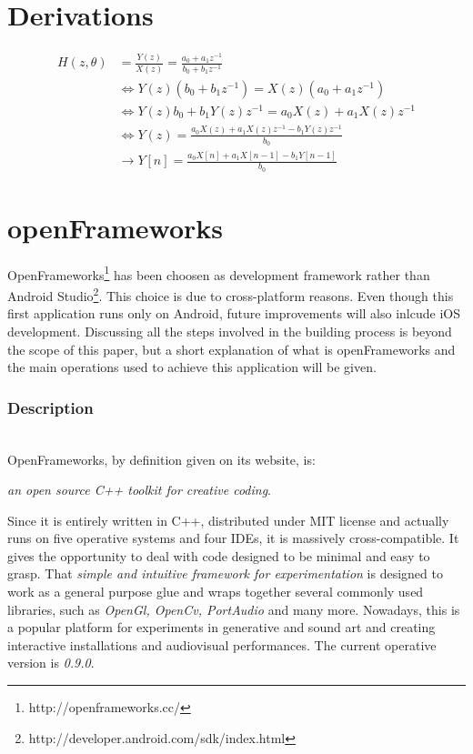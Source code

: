\documentclass[journal]{IEEEtran}
\begin{document}
\begin{appendices}
\section{Derivations}
\begin{equation*}\label{eq:DerivationC++}
\begin{split}
H(z, \theta) &= \frac{Y(z)}{X(z)} = \frac{a_0+a_1z^{-1}}{b_0+b_1z^{-1}}\\
&\iff Y(z)(b_0+b_1z^{-1}) = X(z)(a_0+a_1z^{-1})\\
&\iff Y(z)b_0+b_1Y(z)z^{-1} = a_0X(z)+a_1X(z)z^{-1}\\
&\iff Y(z) = \frac{a_0X(z)+a_1X(z)z^{-1}-b_1Y(z)z^{-1}}{b_0}\\
&\rightarrow Y[n] = \frac{a_0X[n]+a_1X[n-1]-b_1Y[n-1]}{b_0}
\end{split}
\end{equation*} 


\section{openFrameworks}
OpenFrameworks\footnote{http://openframeworks.cc/\label{refOF}} has been choosen as development framework rather than Android Studio\footnote{http://developer.android.com/sdk/index.html}. This choice is due to cross-platform reasons. Even though this first application runs only on Android, future improvements will also inlcude iOS development.
Discussing all the steps involved in the building process is beyond the scope of this paper, but a short explanation of what is openFrameworks and the main operations used to achieve this application will be given. \\
\subsubsection{Description}~\\
OpenFrameworks, by definition given on its website, is:
\begin{center}
{\footnotesize{\textit{an open source C++ toolkit for creative coding}}.}
\end{center}
Since it is entirely written in C++, distributed under MIT license and actually runs on five operative systems and four IDEs, it is massively cross-compatible. It gives the opportunity to deal with code designed to be minimal and easy to grasp. 
That \textit{simple and intuitive framework for experimentation} is designed to work as a general purpose glue and wraps together several commonly used libraries, such as \emph{OpenGl, OpenCv, PortAudio} and many more. Nowadays, this is a popular platform for experiments in generative and sound art and creating interactive installations and audiovisual performances. The current operative version is \emph{0.9.0}.


\end{appendices}
\end{document}
